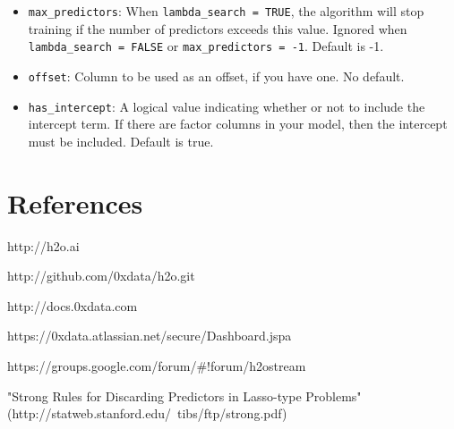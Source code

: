 \documentclass[11pt]{article}
\begin{document}
\begin{itemize}
\item \texttt{max\_predictors}: When \texttt{lambda\_search = TRUE}, the algorithm will stop training if the number of predictors exceeds this value. Ignored when \texttt{ lambda\_search = FALSE} or \texttt{max\_predictors = -1}. Default is -1.
\item \texttt{offset}: Column to be used as an offset, if you have one. No default.
\item \texttt{has\_intercept}: A logical value indicating whether or not to include the intercept term. If there are factor columns in your model, then the intercept must be included. Default is true.


\end{itemize}



\newpage
\section{References}


http://h2o.ai

http://github.com/0xdata/h2o.git

http://docs.0xdata.com

https://0xdata.atlassian.net/secure/Dashboard.jspa

https://groups.google.com/forum/#!forum/h2ostream

"Strong Rules for Discarding Predictors in Lasso-type Problems" (http://statweb.stanford.edu/~tibs/ftp/strong.pdf)
\end{document}
